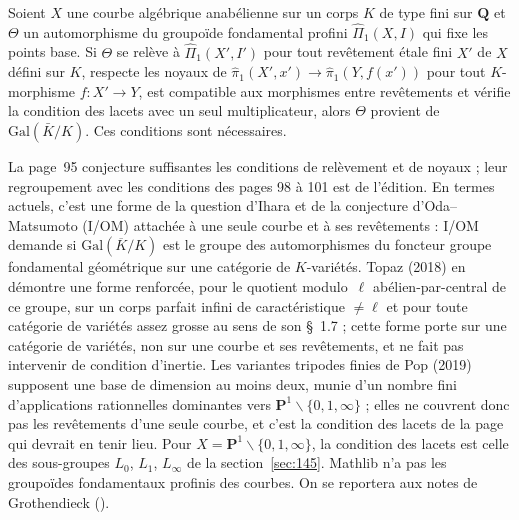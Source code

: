 \begin{encadre}
\begin{conjecture*}
Soient $X$ une courbe algébrique anabélienne sur un corps $K$ de type fini sur $\mathbf Q$ et $\Theta$ un automorphisme du groupoïde fondamental profini $\hat\Pi_1(X, I)$ qui fixe les points base. Si $\Theta$ se relève à $\hat\Pi_1(X', I')$ pour tout revêtement étale fini $X'$ de $X$ défini sur $K$, respecte les noyaux de $\hat\pi_1(X', x') \to \hat\pi_1(Y, f(x'))$ pour tout $K$-morphisme $f : X' \to Y$, est compatible aux morphismes entre revêtements et vérifie la condition des lacets avec un seul multiplicateur, alors $\Theta$ provient de $\mathrm{Gal}(\bar K/K)$. Ces conditions sont nécessaires.
\end{conjecture*}
\end{encadre}
{\small La page~95 conjecture suffisantes les conditions de relèvement et de noyaux ; leur regroupement avec les conditions des pages 98 à 101 est de l'édition. En termes actuels, c'est une forme de la question d'Ihara et de la conjecture d'Oda--Matsumoto (I/OM) attachée à une seule courbe et à ses revêtements : I/OM demande si $\mathrm{Gal}(\overline K/K)$ est le groupe des automorphismes du foncteur groupe fondamental géométrique sur une catégorie de $K$-variétés. Topaz (2018) \cite{topaz2018} en démontre une forme renforcée, pour le quotient modulo~$\ell$ abélien-par-central de ce groupe, sur un corps parfait infini de caractéristique $\neq \ell$ et pour toute catégorie de variétés assez grosse au sens de son §~1.7 ; cette forme porte sur une catégorie de variétés, non sur une courbe et ses revêtements, et ne fait pas intervenir de condition d'inertie. Les variantes tripodes finies de Pop (2019) \cite{pop2019} supposent une base de dimension au moins deux, munie d'un nombre fini d'applications rationnelles dominantes vers $\mathbf P^1 \smallsetminus \{0,1,\infty\}$ ; elles ne couvrent donc pas les revêtements d'une seule courbe, et c'est la condition des lacets de la page qui devrait en tenir lieu. Pour $X = \mathbf P^1 \smallsetminus \{0, 1, \infty\}$, la condition des lacets est celle des sous-groupes $L_0$, $L_1$, $L_\infty$ de la section~\ref{sec:145}. Mathlib n'a pas les groupoïdes fondamentaux profinis des courbes. On se reportera aux notes de Grothendieck ().\par}

